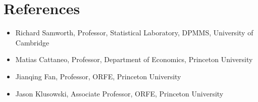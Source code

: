 \documentclass{wgu-cv}
\begin{document}
\section{References}
\vspace{-0.2cm}

\begin{itemize}

  \item
    Richard Samworth,
    Professor,
    Statistical Laboratory,
    DPMMS,
    University of Cambridge

  \item
    Matias Cattaneo,
    Professor,
    Department of Economics,
    Princeton University

  \item
    Jianqing Fan,
    Professor,
    ORFE,
    Princeton University

  \item
    Jason Klusowski,
    Associate Professor,
    ORFE,
    Princeton University

\end{itemize}
\end{document}

